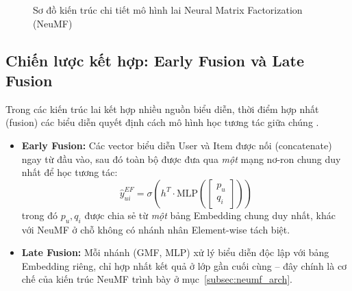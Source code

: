 \begin{figure}[htbp]
    \caption{Sơ đồ kiến trúc chi tiết mô hình lai Neural Matrix Factorization (NeuMF)}
    \label{fig:neumf_architecture}
\end{figure}

\subsection{Chiến lược kết hợp: Early Fusion và Late Fusion}
\label{subsec:early_late_fusion}

Trong các kiến trúc lai kết hợp nhiều nguồn biểu diễn, thời điểm hợp nhất (fusion) các biểu diễn quyết định cách mô hình học tương tác giữa chúng \parencite{he2017ncf}.

\begin{itemize}
    \item \textbf{Early Fusion:} Các vector biểu diễn User và Item được nối (concatenate) ngay từ đầu vào, sau đó toàn bộ được đưa qua \emph{một} mạng nơ-ron chung duy nhất để học tương tác:
    \begin{equation}
        \hat{y}_{ui}^{EF} = \sigma\!\left(h^T \cdot \text{MLP}\!\left(\begin{bmatrix} p_u \\ q_i \end{bmatrix}\right)\right)
        \label{eq:early_fusion}
    \end{equation}
    trong đó $p_u, q_i$ được chia sẻ từ \emph{một} bảng Embedding chung duy nhất, khác với NeuMF ở chỗ không có nhánh nhân Element-wise tách biệt.

    \item \textbf{Late Fusion:} Mỗi nhánh (GMF, MLP) xử lý biểu diễn độc lập với bảng Embedding riêng, chỉ hợp nhất kết quả ở lớp gần cuối cùng -- đây chính là cơ chế của kiến trúc NeuMF trình bày ở mục~\ref{subsec:neumf_arch}.
\end{itemize}

